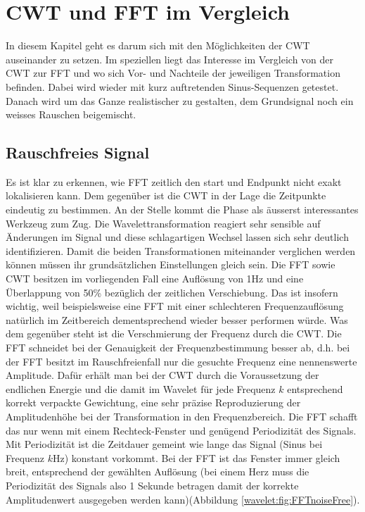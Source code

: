%
%
%
%
\section{CWT und FFT im Vergleich
	\label{wavelets:section:teil4}}

In diesem Kapitel geht es darum sich mit den Möglichkeiten der CWT auseinander zu setzen. Im speziellen liegt das Interesse im Vergleich von der CWT zur FFT und wo sich Vor- und Nachteile der jeweiligen Transformation befinden. Dabei wird wieder mit kurz auftretenden Sinus-Sequenzen getestet.
Danach wird um das Ganze realistischer zu gestalten, dem Grundsignal noch ein weisses Rauschen beigemischt.

\subsection{Rauschfreies Signal
	\label{wavelets:subsection:CWTvsFFTRauschfrei}}
Es ist klar zu erkennen, wie FFT zeitlich den start und Endpunkt nicht exakt lokalisieren kann. Dem gegenüber ist die CWT in der Lage die Zeitpunkte eindeutig zu bestimmen. An der Stelle kommt die Phase als äusserst interessantes Werkzeug zum Zug. Die Wavelettransformation reagiert sehr sensible auf Änderungen im Signal und diese schlagartigen Wechsel lassen sich sehr deutlich identifizieren.
Damit die beiden Transformationen miteinander verglichen werden können müssen ihr grundsätzlichen Einstellungen gleich sein. Die FFT sowie CWT besitzen im vorliegenden Fall eine Auflösung von 1Hz und eine Überlappung von 50\% bezüglich der zeitlichen Verschiebung. Das ist insofern wichtig, weil beispielsweise eine FFT mit einer schlechteren Frequenzauflösung natürlich im Zeitbereich dementsprechend wieder besser performen würde.
Was dem gegenüber steht ist die Verschmierung der Frequenz durch die CWT. Die FFT schneidet bei der Genauigkeit der Frequenzbestimmung besser ab, d.h. bei der FFT besitzt im Rauschfreienfall nur die gesuchte Frequenz eine nennenswerte Amplitude. Dafür erhält man bei der CWT durch die Voraussetzung der endlichen Energie und die damit im Wavelet für jede Frequenz $k$ entsprechend korrekt verpackte Gewichtung, eine sehr präzise Reproduzierung der Amplitudenhöhe bei der Transformation in den Frequenzbereich. Die FFT schafft das nur wenn mit einem Rechteck-Fenster und genügend Periodizität des Signals. Mit Periodizität ist die Zeitdauer gemeint wie lange das Signal (Sinus bei Frequenz $k$Hz) konstant vorkommt. Bei der FFT ist das Fenster immer gleich breit, entsprechend der gewählten Auflösung (bei einem Herz muss die Periodizität des Signals also 1 Sekunde betragen damit der korrekte Amplitudenwert ausgegeben werden kann)(Abbildung \ref{wavelet:fig:FFTnoiseFree}).

